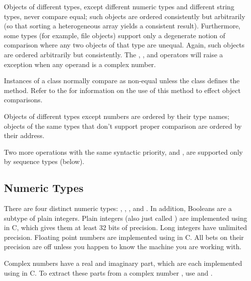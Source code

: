 Objects of different types, except different numeric types and different string types, never
compare equal; such objects are ordered consistently but arbitrarily
(so that sorting a heterogeneous array yields a consistent result).
Furthermore, some types (for example, file objects) support only a
degenerate notion of comparison where any two objects of that type are
unequal.  Again, such objects are ordered arbitrarily but
consistently. The \code{<}, \code{<=}, \code{>} and \code{>=}
operators will raise a  exception when any operand
is a complex number. 

Instances of a class normally compare as non-equal unless the class
defines the  method.  Refer to the
 for
information on the use of this method to effect object comparisons.

 Objects of different types except
numbers are ordered by their type names; objects of the same types
that don't support proper comparison are ordered by their address.

Two more operations with the same syntactic priority,
 and , are supported
only by sequence types (below).


\subsection{Numeric Types \label{typesnumeric}}

There are four distinct numeric types: ,
, 
, and .
In addition, Booleans are a subtype of plain integers.
Plain integers (also just called )
are implemented using  in C, which gives them at least 32
bits of precision.  Long integers have unlimited precision.  Floating
point numbers are implemented using  in C.  All bets on
their precision are off unless you happen to know the machine you are
working with.

Complex numbers have a real and imaginary part, which are each
implemented using  in C.  To extract these parts from
a complex number , use  and .

